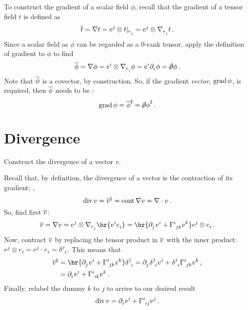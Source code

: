 To construct the gradient of a scalar field $\phi$, recall that the gradient of a tensor field $t$ is defined as
%
\begin{equation*}
  \grad t = \ograd t
  = \tbcov j\tprod\cder t{\tbvec j}
  = \tbcov j\tprod\ocder{\tbvec j}t\,.
\end{equation*}
%
Since a scalar field as $\phi$ can be regarded as a 0-rank tensor, apply the definition of gradient to $\phi$ to find
%
\begin{equation*}
  \grad\phi = \ograd\phi
  = \tbcov i\tprod\ocder{\tbvec i}\phi
  = \tbcov i\cpd i\phi
  = \slashed\partial\phi\,.
\end{equation*}
%
Note that $\overline{\phi}$ is a covector, by construction. So, if the gradient \emph{vector}, $\operatorname{grad}\phi$, is required, then $\overline{\phi}$ needs to be :
%
\begin{equation*}
  \operatorname{grad}\phi = {\overline{\phi}}^{\sharp}
  = {\cancel\partial\phi}^{\sharp}\,.
\end{equation*}


\section{Divergence}
\label{sec:divergence}

Construct the divergence of a vector $v$.

Recall that, by definition, the divergence of a vector is the contraction of its gradient; \ie,
%
\begin{equation*}
  \operatorname{div} v = {\overline{v}}^{\natural}
  = \operatorname{cont}\nabla v
  = \nabla\cdot v\,.
\end{equation*}
%
So, find first $\overline{v}$:
%
\begin{equation*}
  \grad v = \ograd v
  = \tbcov j\tprod\ocder{\tbvec j}\br{\tvec vi\tbvec i}
  = \br{\cpd j\tvec vi + \tchris ijk\tvec vk}\tbcov j\tprod\tbvec i\,.
\end{equation*}
%
Now, contract $\overline{v}$ by replacing the tensor product in $\overline{v}$ with the inner product: $\tbcov j\tprod\tbvec i = \tbcov j\iprod\tbvec i = \tkron ji$. This means that
%
\begin{align*}
  \cont{\grad v} &= \br{\cpd j\tvec vi + \tchris ijk\tvec vk}\tkron ji
  = \cpd j\tkron ji\tvec vi + \tkron ji\tchris ijk\tvec vk \,,\\
  &= \cpd i\tvec vi + \tchris iik\tvec vk \,.
\end{align*}
%
Finally, relabel the dummy $k$ to $j$ to arrive to our desired result
%
\begin{equation*}
  \vdiv v = \cpd i\tvec vi + \tchris iij\tvec vj \,.
\end{equation*}


